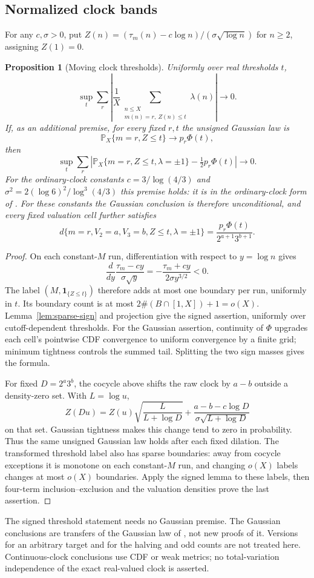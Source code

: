 \documentclass[11pt]{amsart}
\newtheorem{proposition}[theorem]{Proposition}
\theoremstyle{definition}
\theoremstyle{remark}
\newcommand{\PP}{\mathbb P}
\newcommand{\one}{\mathbf 1}
\begin{document}
\subsection{Normalized clock bands}
For any $c,\sigma>0$, put $Z(n)=(\tau_m(n)-c\log n)/(\sigma\sqrt{\log n})$ for $n\ge2$, assigning $Z(1)=0$.
\begin{proposition}[Moving clock thresholds]\label{prop:clock-sign}
Uniformly over real thresholds $t$,
\[
 \sup_t\sum_r\left|\frac1X\sum_{\substack{n\le X\\m(n)=r,\ Z(n)\le t}}\lambda(n)\right|\to0.
\]
If, as an additional premise, for every fixed $r,t$ the unsigned Gaussian law is
\[
 \PP_X\{m=r,Z\le t\}\to p_r\Phi(t),
\]
then
\[
 \sup_t\sum_r\left|\PP_X\{m=r,Z\le t,\lambda=\pm1\}
                         -\tfrac12 p_r\Phi(t)\right|\to0.
\]
For the ordinary-clock constants $c=3/\log(4/3)$ and $\sigma^2=2(\log6)^2/\log^3(4/3)$ this premise holds: it is \cite[Corollary~1.1]{BM} in the ordinary-clock form of \cite[Remark~7.6]{BM}. For these constants the Gaussian conclusion is therefore unconditional, and every fixed valuation cell further satisfies
\[
 d\{m=r,V_2=a,V_3=b,Z\le t,\lambda=\pm1\}
       =\frac{p_r\Phi(t)}{2^{a+1}3^{b+1}}.
\]
\end{proposition}
\begin{proof}
On each constant-$M$ run, differentiation with respect to $y=\log n$ gives
\[
 \frac{d}{dy}\frac{\tau_m-cy}{\sigma\sqrt y}
       =-\frac{\tau_m+cy}{2\sigma y^{3/2}}<0.
\]
The label $(M,\one_{\{Z\le t\}})$ therefore adds at most one boundary per run, uniformly in $t$. Its boundary count is at most $2\#(B\cap[1,X])+1=o(X)$. Lemma~\ref{lem:sparse-sign} and projection give the signed assertion, uniformly over cutoff-dependent thresholds. For the Gaussian assertion, continuity of $\Phi$ upgrades each cell's pointwise CDF convergence to uniform convergence by a finite grid; minimum tightness controls the summed tail. Splitting the two sign masses gives the formula.

For fixed $D=2^a3^b$, the cocycle above shifts the raw clock by $a-b$ outside a density-zero set. With $L=\log u$,
\[
 Z(Du)=Z(u)\sqrt{\frac{L}{L+\log D}}
       +\frac{a-b-c\log D}{\sigma\sqrt{L+\log D}}
\]
on that set. Gaussian tightness makes this change tend to zero in probability. Thus the same unsigned Gaussian law holds after each fixed dilation. The transformed threshold label also has sparse boundaries: away from cocycle exceptions it is monotone on each constant-$M$ run, and changing $o(X)$ labels changes at most $o(X)$ boundaries. Apply the signed lemma to these labels, then four-term inclusion--exclusion and the valuation densities prove the last assertion.
\end{proof}
The signed threshold statement needs no Gaussian premise. The Gaussian conclusions are transfers of the Gaussian law of \cite{BM}, not new proofs of it. Versions for an arbitrary target and for the halving and odd counts are not treated here. Continuous-clock conclusions use CDF or weak metrics; no total-variation independence of the exact real-valued clock is asserted.
\end{document}
